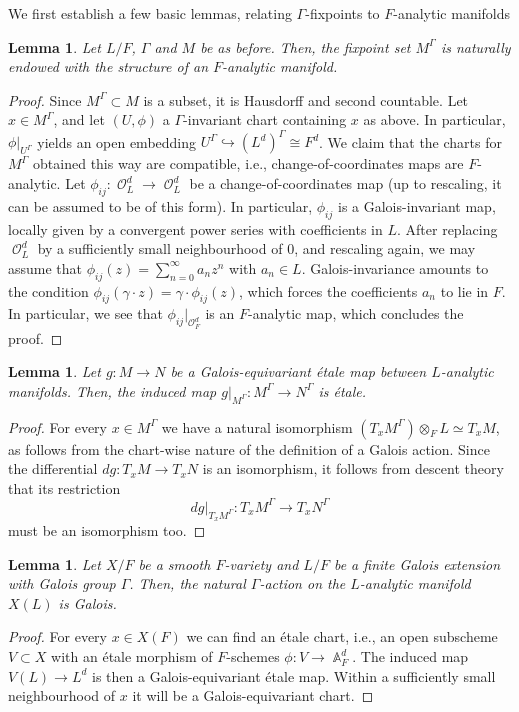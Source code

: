 \documentclass{article}
\DeclareMathOperator{\Oc}{\mathcal{O}}
\DeclareMathOperator{\Ab}{\mathbb{A}}
\theoremstyle{definition}
\theoremstyle{plain}
\newtheorem{lemma}[definition]{Lemma}
\begin{document}
We first establish a few basic lemmas, relating $\Gamma$-fixpoints to $F$-analytic manifolds
\begin{lemma}\label{lemma:Galois-fix}
 Let $L/F$, $\Gamma$ and $M$ be as before. Then, the fixpoint set $M^{\Gamma}$ is naturally endowed with the structure of an $F$-analytic manifold.  
\end{lemma}
\begin{proof}
Since $M^{\Gamma} \subset M$ is a subset, it is Hausdorff and second countable. Let $x \in M^{\Gamma}$, and let $(U,\phi)$ a $\Gamma$-invariant chart containing $x$ as above. 
In particular, $\phi|_{U^{\Gamma}}$ yields an open embedding $U^{\Gamma} \hookrightarrow (L^d)^{\Gamma} \cong F^d$. We claim that the charts for $M^{\Gamma}$ obtained this way are compatible, i.e., change-of-coordinates maps are $F$-analytic. Let $\phi_{ij}\colon \Oc_L^d \to \Oc^d_L$ be a change-of-coordinates map (up to rescaling, it can be assumed to be of this form). In particular, $\phi_{ij}$ is a Galois-invariant map, locally given by a convergent power series with coefficients in $L$. After replacing $\Oc_L^d$ by a sufficiently small neighbourhood of $0$, and rescaling again, we may assume that $\phi_{ij}(z) = \sum_{n=0}^{\infty} a_n z^n$ with $a_n \in L$. Galois-invariance amounts to the condition $\phi_{ij}(\gamma \cdot{}z) = \gamma\cdot{} \phi_{ij}(z)$, which forces the coefficients $a_n$ to lie in $F$. In particular, we see that $\phi_{ij}|_{\Oc_F^d}$ is an $F$-analytic map, which concludes the proof.
 \end{proof}
 
\begin{lemma}\label{lemma:Gamma-etale}
Let $g\colon M \to N$ be a Galois-equivariant \'etale map between $L$-analytic manifolds. Then, the induced map $g|_{M^{\Gamma}} \colon M^{\Gamma} \to N^{\Gamma}$ is \'etale. 
\end{lemma}
\begin{proof}
For every $x \in M^{\Gamma}$ we have a natural isomorphism $(T_x M^{\Gamma}) \otimes_F L \simeq T_x M$, as follows from the chart-wise nature of the definition of a Galois action. Since the differential $dg \colon T_x M \to T_x N$ is an isomorphism, it follows from descent theory that its restriction $$dg|_{T_xM^{\Gamma}}\colon T_xM^{\Gamma}\to T_xN^{\Gamma}$$ must be an isomorphism too.
\end{proof}


\begin{lemma}\label{lemma:Galois}
Let $X/F$ be a smooth $F$-variety and $L/F$ be a finite Galois extension with Galois group $\Gamma$. Then, the natural $\Gamma$-action on the $L$-analytic manifold $X(L)$ is Galois.
\end{lemma}
\begin{proof}
For every $x \in X(F)$ we can find an \'etale chart, i.e., an open subscheme $V \subset X$ with an \'etale morphism of $F$-schemes $\phi\colon V \to \Ab_F^d$. The induced map $V(L) \to L^d$ is then a Galois-equivariant \'etale map. Within a sufficiently small neighbourhood of $x$ it will be a Galois-equivariant chart.
\end{proof}
\end{document}
